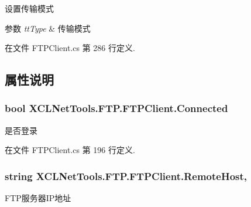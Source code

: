 设置传输模式 


\begin{DoxyParams}{参数}
{\em tt\-Type} & 传输模式\\
\hline
\end{DoxyParams}


在文件 F\-T\-P\-Client.\-cs 第 286 行定义.



\subsection{属性说明}
\hypertarget{class_x_c_l_net_tools_1_1_f_t_p_1_1_f_t_p_client_af3e0775ddf1dc1530b82b5b0a6aa4d25}{
\subsubsection[{Connected}]{\setlength{\rightskip}{0pt plus 5cm}bool X\-C\-L\-Net\-Tools.\-F\-T\-P.\-F\-T\-P\-Client.\-Connected\hspace{0.3cm}{\ttfamily [get]}}}\label{class_x_c_l_net_tools_1_1_f_t_p_1_1_f_t_p_client_af3e0775ddf1dc1530b82b5b0a6aa4d25}


是否登录 



在文件 F\-T\-P\-Client.\-cs 第 196 行定义.

\hypertarget{class_x_c_l_net_tools_1_1_f_t_p_1_1_f_t_p_client_a020891b3ab32deba2b8e2b2204349f1d}{
\subsubsection[{Remote\-Host}]{\setlength{\rightskip}{0pt plus 5cm}string X\-C\-L\-Net\-Tools.\-F\-T\-P.\-F\-T\-P\-Client.\-Remote\-Host\hspace{0.3cm}{\ttfamily [get]}, {\ttfamily [set]}}}\label{class_x_c_l_net_tools_1_1_f_t_p_1_1_f_t_p_client_a020891b3ab32deba2b8e2b2204349f1d}


F\-T\-P服务器\-I\-P地址 



